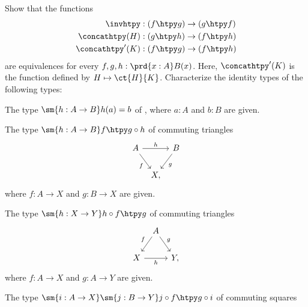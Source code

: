 
\begin{exercises}
  \exitem \label{ex:is-equiv-inv-htpy}Show that the functions
  \begin{align*}
    \invhtpy & : (f \htpy g) \to (g \htpy f) \\
    \concathtpy(H) & : (g \htpy h) \to (f \htpy h) \\
    \concathtpy'(K) & : (f \htpy g) \to (f \htpy h)
  \end{align*}
  are equivalences for every $f,g,h : \prd{x:A}B(x)$. Here, $\concathtpy'(K)$ is the function defined by $H\mapsto \ct{H}{K}$.
  \exitem Characterize the identity types of the following types:
  \begin{subexenum}
  \item The type $\sm{h:A\to B}h(a)=b$ of , where $a:A$ and $b:B$ are given.
  \item The type $\sm{h:A\to B}f\htpy g\circ h$ of commuting triangles
    \begin{equation*}
      \begin{tikzcd}[column sep=tiny]
        A \arrow[rr,"h"] \arrow[dr,swap,"f"] & & B \arrow[dl,"g"] \\
        & X,
      \end{tikzcd}
    \end{equation*}
    where $f:A\to X$ and $g:B\to X$ are given.
  \item The type $\sm{h:X\to Y}h\circ f\htpy g$ of commuting triangles
    \begin{equation*}
      \begin{tikzcd}[column sep=tiny]
        & A \arrow[dl,swap,"f"] \arrow[dr,"g"] \\
        X \arrow[rr,swap,"h"] & & Y,
      \end{tikzcd}
    \end{equation*}
    where $f:A\to X$ and $g:A\to Y$ are given.
  \item The type $\sm{i:A\to X}\sm{j:B\to Y}j\circ f\htpy g\circ i$ of commuting squares
    \begin{equation*}

\end{equation*}
\end{subexenum}
\end{exercises}
